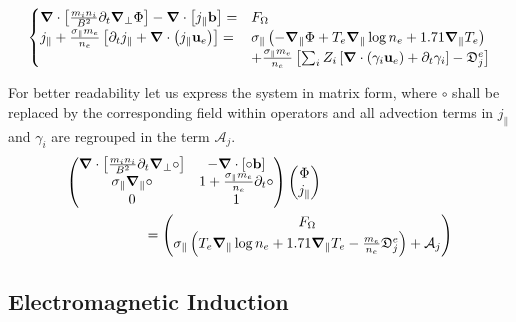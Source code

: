 \begin{equation}
	\label{eq:S3X_vorticityEquation_ElectronInertia}
	\begin{cases}
		\grad\cdot\left[\frac{m_i n_i}{ B^2}\partial_t\grad_\perp\Phi\right] - \grad\cdot\left[j_\parallel\mathbf{b}\right]=& F_\Omega \\
		j_\parallel + \frac{\sigma_\parallel m_e}{n_e}\left[\partial_t j_\parallel + \grad\cdot\left(j_\parallel\mathbf{u}_e\right)\right] =& \sigma_\parallel \left(-\grad_\parallel\Phi + T_e\grad_\parallel\log n_e + 1.71\grad_\parallel T_e \right) \\ 
		& + \frac{\sigma_\parallel m_e}{n_e}\left[\sum_iZ_i\left[\grad\cdot\left(\gamma_i\mathbf{u}_e \right) + \partial_t \gamma_i\right] - \mathfrak{D}_j^e\right]
	\end{cases}
\end{equation}



For better readability let us express the system in matrix form, where $\circ$ shall be replaced by the corresponding field within operators and all advection terms in $j_\parallel$ and $\gamma_i$ are regrouped in the term $\mathcal{A}_j$. 
\begin{align}
	\makebox[0.8\textwidth][l]{$\displaystyle
		\begin{pmatrix}
			\grad\cdot\left[\frac{m_i n_i}{ B^2}\partial_t\grad_\perp\circ\right] & 
			- \grad\cdot\left[\circ\mathbf{b}\right] \\
			\sigma_\parallel\grad_\parallel\circ &
			1 + \frac{\sigma_\parallel m_e}{n_e}\partial_t \circ \\
			0 & 1 
		\end{pmatrix}
		\begin{pmatrix}
			\Phi \\ j_\parallel
		\end{pmatrix}
		$} \nonumber \\	
	\makebox[0.8\textwidth][r]{$\displaystyle
		=\begin{pmatrix}
			F_\Omega \\
			\sigma_\parallel\left(T_e\grad_\parallel\log n_e + 1.71\grad_\parallel T_e - \frac{m_e}{n_e}\mathfrak{D}_j^e \right) + \mathcal{A}_j		
		\end{pmatrix}
		$} \label{eq:S3X_vorticityEquation_ElectronInertia_matrix}
\end{align}






\subsection{Electromagnetic Induction}

